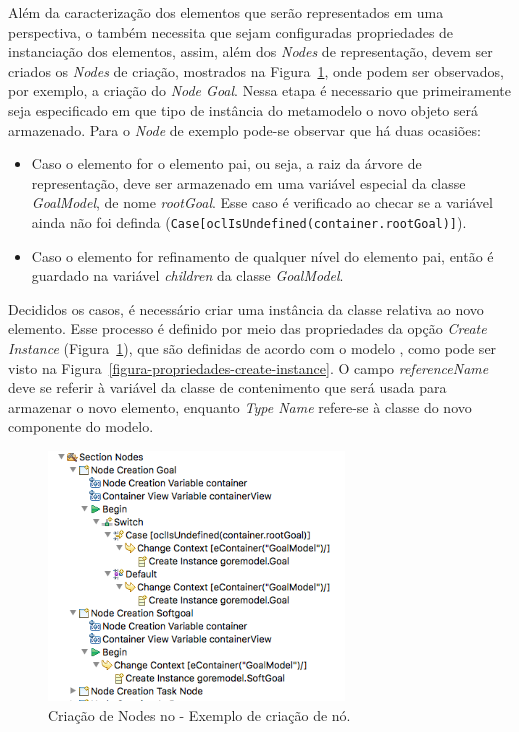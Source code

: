 Além da caracterização dos elementos que serão representados em uma perspectiva, o \sirius também necessita que sejam configuradas propriedades de instanciação dos elementos, assim, além dos \textit{Nodes} de representação, devem ser criados os \textit{Nodes} de criação, mostrados na Figura~\ref{figura-criacao-node}, onde podem ser observados, por exemplo, a criação do \textit{Node Goal}. Nessa etapa é necessario que primeiramente seja especificado em que tipo de instância do metamodelo o novo objeto será armazenado. Para o \textit{Node} de exemplo pode-se observar que há duas ocasiões:
\begin{itemize}
	\item Caso o elemento for o elemento pai, ou seja, a raiz da árvore de representação, deve ser armazenado em uma variável especial da classe \textit{GoalModel}, de nome \textit{rootGoal}. Esse caso é verificado ao checar se a variável ainda não foi definda (\texttt{Case[oclIsUndefined(container.rootGoal)]}).
	\item Caso o elemento for refinamento de qualquer nível do elemento pai, então é guardado na variável \textit{children} da classe \textit{GoalModel}.
\end{itemize}

Decididos os casos, é necessário criar uma instância da classe relativa ao novo elemento. Esse processo é definido por meio das propriedades da opção \textit{Create Instance} (Figura~\ref{figura-criacao-node}), que são definidas de acordo com o modelo \ecore, como pode ser visto na Figura~\ref{figura-propriedades-create-instance}. O campo \textit{referenceName} deve se referir à variável da classe de contenimento que será usada para armazenar o novo elemento, enquanto \textit{Type Name} refere-se à classe do novo componente do modelo.

\begin{figure}
	\centering
	\includegraphics[width=0.7\textwidth]{figuras/unagi/exemplo-criacao-nodes.png}
	\caption{Criação de Nodes no \sirius - Exemplo de criação de nó.}
	\label{figura-criacao-node}
\end{figure}

